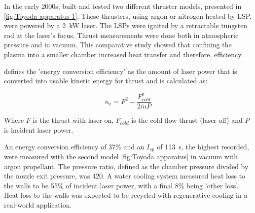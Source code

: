 
        In the early 2000s, \textcite{toyodaThrustPerformanceCW2002} built and tested two different thruster models, presented in \autoref{fig:Toyoda apparatus 1}. These thrusters, using argon or nitrogen heated by LSP, were powered by a \qty{2}{kW}  laser. The LSPs were ignited by a retractable tungsten rod at the laser's focus. Thrust measurements were done both in atmospheric pressure and in vacuum. This comparative study showed that confining the plasma into a smaller chamber increased heat transfer and therefore, efficiency.
        
        \textcite{toyodaThrustPerformanceCW2002} defines the 'energy conversion efficiency' as the amount of laser power that is converted into usable kinetic energy for thrust and is calculated as:

        \[ n_e = F^2 - \frac{F^2_{cold}}{2 \dot{m} P}\]

        Where $F$ is the thrust with laser on, $F_{cold}$ is the cold flow thrust (laser off) and $P$ is incident laser power.

        An energy conversion efficiency of 37\% and an $I_{sp}$ of \qty{113}{s}, the highest recorded, were measured with the second model \autoref{fig:Toyoda apparatus} in vacuum with argon propellant. The pressure ratio, defined as the chamber pressure divided by the nozzle exit pressure, was 420. A water cooling system measured heat loss to the walls to be 55\% of incident laser power, with a final 8\% being 'other loss'. Heat loss to the walls was expected to be recycled with regenerative cooling in a real-world application.

